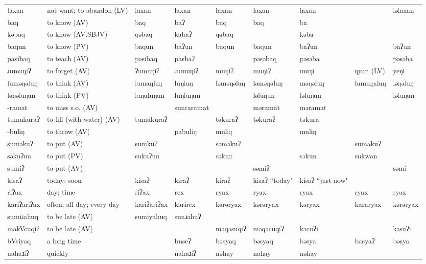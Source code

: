 \begin{landscape}
\begin{longtable}{*{9}{>{\raggedright\arraybackslash}p{}}}
\text{*}laxan & not want; to abandon (LV) & laxan & laxan & laxan & laxan & laxan &  & ləlaxan\\
\text{*}baq & to know (AV) & baq & baʔ & baq & baq & ba &  & \\
\text{*}kəbaq & to know (AV.SBJV) & qəbaq & kabaʔ & qəbaq &  & kəba &  & \\
\text{*}baqun & to know (PV) & baqun & baʔun & baqun & baqun & baʔun &  & baʔun\\
\text{*}pasibaq & to teach (AV) & pəsibaq & pasbaʔ &  & pəsəbaq & pəsəba &  & pəsəba\\
\text{*}ɹumuŋiʔ & to forget (AV) & ʔumuŋiʔ & ɹumuŋiʔ & muŋiʔ & muŋiʔ & muŋi & ŋyan (LV) & yeŋi\\
\text{*}luməŋəluŋ & to think (AV) & lumaŋluŋ & luŋluŋ & ləməŋəluŋ & ləməŋəluŋ & məŋəluŋ & lumuŋaluŋ & ləŋəluŋ\\
\text{*}ləŋəluŋun & to think (PV) & luŋuluŋun & luŋluŋun &  & ləluŋun & ləluŋun &  & ləluŋun\\
\text{*}-ramat & to miss s.o. (AV) &  & sunraramat &  & məramat & məramat &  & \\
\text{*}tumukuraʔ & to fill (with water) (AV) & tumukuraʔ &  & təkuraʔ & təkuraʔ & təkura &  & \\
\text{*}-buliŋ & to throw (AV) &  & pabuliŋ & muliŋ &  & muliŋ &  & \\
\text{*}suməkuʔ & to put (AV) & sumkuʔ &  & səməkuʔ &  &  & sumakuʔ & \\
\text{*}səkuʔun & to put (PV) & sukuʔun &  & səkun &  & səkun & sukwan & \\
\text{*}sumiʔ & to put (AV) &  &  &  & səmiʔ &  &  & səmi\\
\text{*}kisaʔ & today; soon & kisaʔ & kiraʔ & kiraʔ & kisaʔ ``today" & kisaʔ ``just now" &  & \\
\text{*}riʔax & day; time & riʔax & rex & ryax & ryax & ryax & ryax & ryax\\
\text{*}kariʔariʔax & often; all day; every day & kariʔariʔax & karirex & kərəryax & kərəryax & kəryax & kararyax & kərəryax\\
\text{*}sumiɹahuq & to be late (AV) & sumiyahuq & sunɹahuʔ &  &  &  &  & \\
\text{*}makVcuqiʔ & to be late (AV) &  &  & məqəsuqiʔ & məqəcuqiʔ & kəcuʔi &  & kəsuʔi\\
\text{*}bVsiyaq & a long time &  & buseʔ & bəsyaq & bəsyaq & bəsya & basyaʔ & bəsya\\
\text{*}nahaɹiʔ & quickly &  & nahaɹiʔ & nəhay & nahay & nəhay &  & \\

\end{longtable}
\end{landscape}
